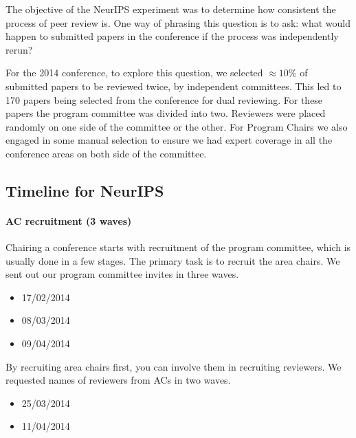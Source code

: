 The objective of the NeurIPS experiment was to determine how consistent
the process of peer review is. One way of phrasing this question is to
ask: what would happen to submitted papers in the conference if the
process was independently rerun?

For the 2014 conference, to explore this question, we selected
\(\approx 10\%\) of submitted papers to be reviewed twice, by
independent committees. This led to 170 papers being selected from the
conference for dual reviewing. For these papers the program committee
was divided into two. Reviewers were placed randomly on one side of the
committee or the other. For Program Chairs we also engaged in some
manual selection to ensure we had expert coverage in all the conference
areas on both side of the committee.

\hypertarget{timeline-for-neurips}{%
\subsection{Timeline for NeurIPS}\label{timeline-for-neurips}}

\begin{flushright}
\end{flushright}

\paragraph{AC recruitment (3 waves)}

Chairing a conference starts with recruitment of the program committee,
which is usually done in a few stages. The primary task is to recruit
the area chairs. We sent out our program committee invites in three
waves.

\begin{itemize}
\tightlist
\item
  17/02/2014
\item
  08/03/2014
\item
  09/04/2014
\end{itemize}

By recruiting area chairs first, you can involve them in recruiting
reviewers. We requested names of reviewers from ACs in two waves.

\begin{itemize}
\tightlist
\item
  25/03/2014
\item
  11/04/2014
\end{itemize}

